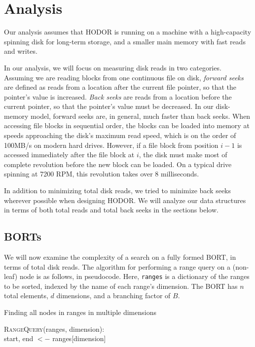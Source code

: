 \documentclass[11pt, oneside]{article}
\newcommand{\ms}{\texttt}
\begin{document}
\section{Analysis}

Our analysis assumes that HODOR is running on a machine with a high-capacity
spinning disk for long-term storage, and a smaller main memory with fast 
reads and writes.

In our analysis, we will focus on measuring disk reads in two categories.
Assuming we are reading blocks from one continuous file on disk, \textit{forward
seeks} are defined as reads from a location after the current file pointer, so
that the pointer's value is increased. \textit{Back seeks} are reads from a
location before the current pointer, so that the pointer's value must be
decreased. In our disk-memory model, forward seeks are, in general, much faster
than back seeks. When accessing file blocks in sequential order, the blocks can
be loaded into memory at speeds approaching the disk's maximum read speed, which
is on the order of 100MB/s on modern hard drives. However, if a file block from
position $i-1$ is accessed immediately after the file block at $i$, the disk
must make most of complete revolution before the new block can be loaded. On a
typical drive spinning at 7200 RPM, this revolution takes over 8 milliseconds.


In addition to minimizing total disk reads, we tried to minimize back seeks
wherever possible when designing HODOR. We will analyze our data structures in
terms of both total reads and total back seeks in the sections below.

\subsection{BORTs}

We will now examine the complexity of a search on a fully formed BORT, in terms
of total disk reads. The algorithm for performing a range query on a (non-leaf)
node is as follows, in pseudocode. Here, \ms{ranges} is a dictionary of the
ranges to be sorted, indexed by the name of each range's dimension. The BORT has
$n$ total elements, $d$ dimensions, and a branching factor of $B$.

\begin{algorithm}
    \caption{Finding all nodes in ranges in multiple dimensions}
    \begin{algorithmic}[1]
        \Statex
            \EndIf
          \EndFor
          \State \Return{$\delta$}
        \EndFunction
    \end{algorithmic}
\end{algorithm}
\textsc{RangeQuery}(ranges, dimension): \\
    start, end $<-$ ranges[dimension] \\
    
\end{document}
